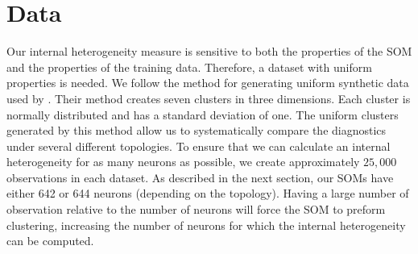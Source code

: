 \section{Data}
\label{meth:data}
Our internal heterogeneity measure is sensitive to both the properties of the SOM
and the properties of the training data. Therefore, a dataset with uniform
properties is needed. We follow the method for generating uniform synthetic
data used by \cite{wu2006}.  Their method creates seven clusters in three
dimensions.  Each cluster is normally distributed and has a standard deviation
of one.  The uniform clusters generated by this method allow us to
systematically compare the diagnostics under several different topologies.  To
ensure that we can calculate an internal heterogeneity for as many neurons as
possible, we create approximately $25,000$ observations in each dataset.  As
described in the next section, our SOMs have either 642 or 644 neurons
(depending on the topology).  Having a large number of observation relative to
the number of neurons will force the SOM to preform clustering, increasing the
number of neurons for which the internal heterogeneity can be computed.





